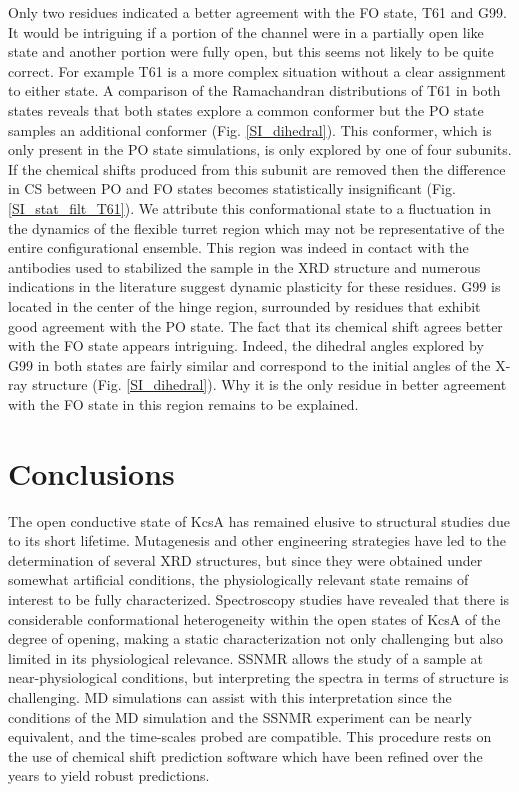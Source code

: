 \documentclass[%
 aip,
 amsmath,amssymb,
 preprint,%
]{revtex4-1}
\begin{document}
Only two residues indicated a better agreement with the FO state, T61 and G99. It would be intriguing if a portion of the channel were in a partially open like state and another portion were fully open, but this seems not likely to be quite correct. For example T61 is a more complex situation without a clear assignment to either state. A comparison of the Ramachandran distributions of T61 in both states reveals that both states explore a common conformer but the PO state samples an additional conformer (Fig. \ref{SI_dihedral}). This conformer, which is only present in the PO state simulations, is only explored by one of four subunits. If the chemical shifts produced from this subunit are removed then the difference in CS between PO and FO states becomes statistically insignificant (Fig. \ref{SI_stat_filt_T61}). We attribute this conformational state to a fluctuation in the dynamics of the flexible turret region which may not be representative of the entire configurational ensemble. This region was indeed in contact with the antibodies used to stabilized the sample in the XRD structure and numerous indications in the literature suggest dynamic plasticity for these residues.\cite{Cuello2010}  G99 is located in the center of the hinge region, surrounded by residues that exhibit good agreement with the PO state.  The fact that its chemical shift agrees better with  the FO state appears intriguing. Indeed, the dihedral angles explored by G99 in both states are fairly similar and correspond to the initial angles of the X-ray structure (Fig. \ref{SI_dihedral}). Why it is the only residue in better agreement with the FO state in this region remains to be explained.



\section{Conclusions}

The open conductive state of KcsA has remained elusive to structural studies due to its short lifetime. Mutagenesis and other engineering strategies have led to the determination of several XRD structures, but since they were obtained under somewhat artificial conditions, the physiologically relevant state remains of interest to be fully characterized. Spectroscopy studies have revealed that there is considerable conformational heterogeneity within the open states of KcsA of the degree of opening, making a static characterization not only challenging but also limited in its physiological relevance. SSNMR allows the study of a sample at near-physiological conditions, but interpreting the spectra in terms of structure is challenging. MD simulations can assist with this interpretation since the conditions of the MD simulation and the SSNMR experiment can be nearly equivalent, and the time-scales probed are compatible. This procedure rests on the use of chemical shift prediction software which have been refined over the years to yield robust predictions.
\end{document}
